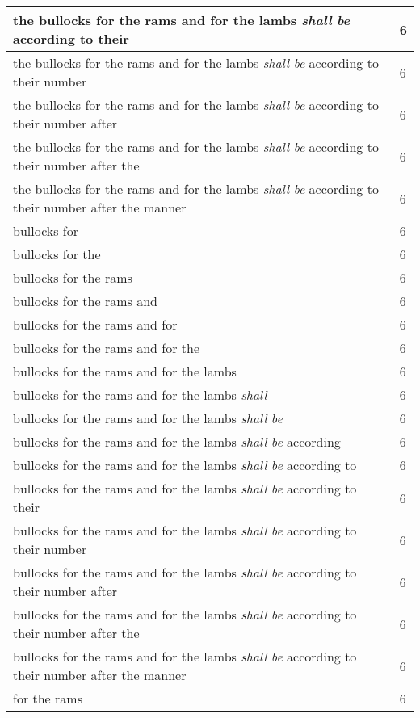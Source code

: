 \begin{center}
\begin{longtable}{|p{3.0in}|p{0.5in}|}
the bullocks for the rams and for the lambs \emph{shall} \emph{be} according to their & 6\\ \hline 
the bullocks for the rams and for the lambs \emph{shall} \emph{be} according to their number & 6\\ \hline 
the bullocks for the rams and for the lambs \emph{shall} \emph{be} according to their number after & 6\\ \hline 
the bullocks for the rams and for the lambs \emph{shall} \emph{be} according to their number after the & 6\\ \hline 
the bullocks for the rams and for the lambs \emph{shall} \emph{be} according to their number after the manner & 6\\ \hline 
bullocks for & 6\\ \hline 
bullocks for the & 6\\ \hline 
bullocks for the rams & 6\\ \hline 
bullocks for the rams and & 6\\ \hline 
bullocks for the rams and for & 6\\ \hline 
bullocks for the rams and for the & 6\\ \hline 
bullocks for the rams and for the lambs & 6\\ \hline 
bullocks for the rams and for the lambs \emph{shall} & 6\\ \hline 
bullocks for the rams and for the lambs \emph{shall} \emph{be} & 6\\ \hline 
bullocks for the rams and for the lambs \emph{shall} \emph{be} according & 6\\ \hline 
bullocks for the rams and for the lambs \emph{shall} \emph{be} according to & 6\\ \hline 
bullocks for the rams and for the lambs \emph{shall} \emph{be} according to their & 6\\ \hline 
bullocks for the rams and for the lambs \emph{shall} \emph{be} according to their number & 6\\ \hline 
bullocks for the rams and for the lambs \emph{shall} \emph{be} according to their number after & 6\\ \hline 
bullocks for the rams and for the lambs \emph{shall} \emph{be} according to their number after the & 6\\ \hline 
bullocks for the rams and for the lambs \emph{shall} \emph{be} according to their number after the manner & 6\\ \hline 
for the rams & 6\\ \hline 

\end{longtable}
\end{center}
